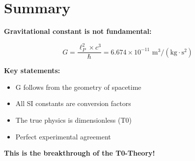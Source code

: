 \documentclass[12pt,a4paper]{article}
\theoremstyle{definition}
\begin{document}
	\section{Summary}
	
	\begin{formula}
		\textbf{Gravitational constant is not fundamental:}
		
		\begin{equation}
			G = \frac{\ell_P^2 \times c^3}{\hbar} = 6.674 \times 10^{-11} \text{ m}^3/(\text{kg} \cdot \text{s}^2)
		\end{equation}
		
		\textbf{Key statements:}
		\begin{itemize}
			\item G follows from the geometry of spacetime
			\item All SI constants are conversion factors
			\item The true physics is dimensionless (T0)
			\item Perfect experimental agreement
		\end{itemize}
		
		\textbf{This is the breakthrough of the T0-Theory!}
	\end{formula}
	
	
	
\end{document}
